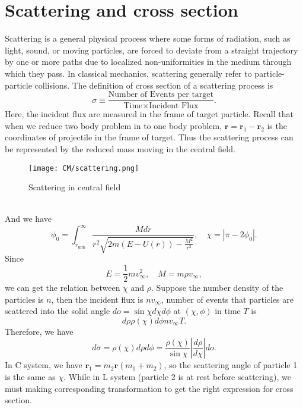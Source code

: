 \section{Scattering and cross section}
Scattering is a general physical process where some forms of radiation, such as light, sound, or moving particles, are forced to deviate from a straight trajectory by one or more paths due to localized non-uniformities in the medium through which they pass.  In classical mechanics, scattering generally refer to particle-particle collisions.
The definition of cross section  of a scattering process is
\[\sigma \equiv \frac{\mbox{Number of Events per target}}{\mbox{Time} \times \mbox{Incident Flux}}.\]
Here, the incident flux are measured in the frame of target particle. Recall that when we reduce two body problem in to one body problem, $\bm{r} = \bm{r}_1 - \bm{r}_2$ is the coordinates of projectile in the frame of target. Thus the scattering process can be represented by the reduced mass moving in the central field. 
\begin{figure}[!h]
	\centering
	\texttt{[image: CM/scattering.png]}
	\caption{Scattering in central field}
\end{figure}
\\
And we have
\[\phi_0 = \int_{r_{\mathrm{min}}}^{\infty} \frac{Mdr}{r^2 \sqrt{2m(E-U(r))-\frac{M^2}{r^2}}} ,\quad \chi = |\pi - 2\phi_0|.\]
Since
\[E = \frac{1}{2}m v_{\infty}^2 ,\quad M = m\rho v_{\infty},\]
we can get the relation between  $\chi$ and $\rho$. Suppose the number density of the particles is $n$, then the incident flux is $nv_{\infty}$, number of events that particles are scattered into the solid angle $do = \sin\chi d\chi d\phi$ at $(\chi,\phi)$ in time $T$ is
\[d\rho \rho(\chi) d\phi nv_{\infty} T .\]
Therefore, we have
\[d\sigma = \rho(\chi) d\rho d\phi = \frac{\rho(\chi)}{\sin\chi} \left| \frac{d\rho}{d\chi} \right| do.\]
In C system, we have $\bm{r}_1 = {m_2 \bm{r}}{(m_1+m_2)} $, so the scattering angle of particle 1 is the same as $\chi$. While in L system (particle 2 is at rest before scattering), we must making corresponding transformation to get the right expression for cross section.

